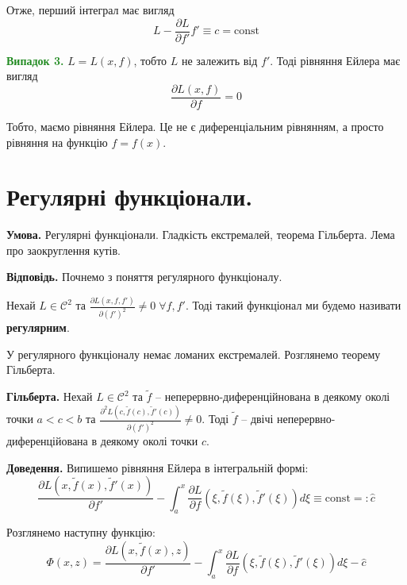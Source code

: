 \documentclass[14pt]{extarticle}
\newcommand{\<}{\langle}
\renewcommand{\>}{\rangle}
\theoremstyle{mystyle}{\newtheorem{definition}{Definition}[section]}
\theoremstyle{mystyle}{\newtheorem{proposition}[definition]{Proposition}}
\theoremstyle{mystyle}{\newtheorem{theorem}[definition]{Theorem}}
\theoremstyle{mystyle}{\newtheorem{lemma}[definition]{Lemma}}
\theoremstyle{mystyle}{\newtheorem{corollary}[definition]{Corollary}}
\theoremstyle{mystyle}{\newtheorem*{remark}{Remark}}
\theoremstyle{mystyle}{\newtheorem*{remarks}{Remarks}}
\theoremstyle{mystyle}{\newtheorem*{example}{Example}}
\theoremstyle{mystyle}{\newtheorem*{examples}{Examples}}
\theoremstyle{definition}{\newtheorem*{exercise}{Exercise}}
\theoremstyle{cstyle}{\newtheorem*{cthm}{}}
\theoremstyle{warn}
\begin{document}
Отже, перший інтеграл має вигляд
\begin{equation}
    L-\frac{\partial L}{\partial f'}f' \equiv c = \text{const}
\end{equation}

\textcolor{ForestGreen}{\textbf{Випадок 3.}} $L = L(x,f)$, тобто $L$ не залежить від $f'$. Тоді рівняння Ейлера має вигляд
\begin{equation}
    \frac{\partial L(x,f)}{\partial f} = 0
\end{equation}

Тобто, маємо рівняння Ейлера. Це не є диференціальним рівнянням, а просто рівняння на функцію $f=f(x)$.

\pagebreak
\section{Регулярні функціонали.}

\textbf{Умова.} Регулярні функціонали. Гладкість екстремалей, теорема Гільберта. Лема про заокруглення
кутів.

\textbf{Відповідь.} Почнемо з поняття регулярного функціоналу.

\begin{definition}
    Нехай $L \in \mathcal{C}^2$ та $\frac{\partial L(x,f,f')}{\partial (f')^2} \neq 0 \; \forall f,f'$. Тоді такий функціонал ми будемо називати \textbf{регулярним}.
\end{definition}

У регулярного функціоналу немає ломаних екстремалей. Розглянемо теорему Гільберта.

\begin{theorem}
    \textbf{Гільберта.} Нехай $L \in \mathcal{C}^2$ та $\widetilde{f}$ -- неперервно-диференційнована в деякому околі точки $a<c<b$ та $\frac{\partial^2L(c,\widetilde{f}(c),\widetilde{f}'(c))}{\partial (f')^2} \neq 0$.
    Тоді $\widetilde{f}$ -- двічі неперервно-диференційована в деякому околі точки $c$.
\end{theorem}

\textbf{Доведення.} Випишемо рівняння Ейлера в інтегральній формі:
\begin{equation}
    \frac{\partial L(x,\widetilde{f}(x),\widetilde{f}'(x))}{\partial f'} - \int_a^x \frac{\partial L}{\partial f}(\xi,\widetilde{f}(\xi),\widetilde{f}'(\xi))d\xi \equiv \text{const} =: \hat{c}
\end{equation}

Розглянемо наступну функцію:
\begin{equation}
    \Phi(x,z) = \frac{\partial L(x,\widetilde{f}(x),z)}{\partial f'} - \int_a^x \frac{\partial L}{\partial f}(\xi,\widetilde{f}(\xi),\widetilde{f}'(\xi))d\xi - \hat{c}
\end{equation}
\end{document}
